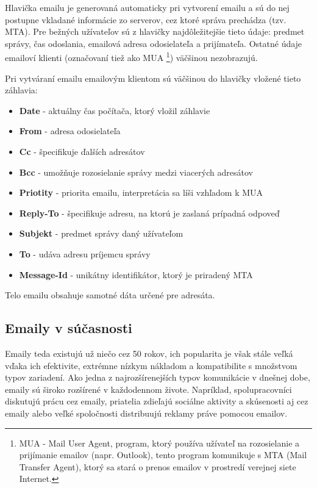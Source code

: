 \documentclass[slovak,master,public,dept460,male,cpdeclaration,oneside]{diploma}
\begin{document}
Hlavička emailu je generovaná automaticky pri vytvorení emailu a sú do nej postupne vkladané informácie zo serverov, cez ktoré správa prechádza (tzv. MTA). Pre bežných užívateľov sú z hlavičky najdôležitejšie tieto údaje: predmet správy, čas odoslania, emailová adresa odosielateľa a prijímateľa. Ostatné údaje emailoví klienti (označovaní tiež ako MUA \footnote{MUA - Mail User Agent, program, ktorý používa užívateľ na rozosielanie a prijímanie emailov (napr. Outlook), tento program komunikuje s MTA (Mail Transfer Agent), ktorý sa stará o prenos emailov v prostredí verejnej siete Internet.}) väčšinou nezobrazujú.


Pri vytváraní emailu emailovým klientom sú väčšinou do hlavičky vložené tieto záhlavia:

\begin{itemize}
\item \textbf{Date} - aktuálny čas počítača, ktorý vložil záhlavie
\item \textbf{From} - adresa odosielateľa
\item \textbf{Cc} - špecifikuje ďalších adresátov
\item \textbf{Bcc} - umožňuje rozosielanie správy medzi viacerých adresátov
\item \textbf{Priotity} - priorita emailu, interpretácia sa líši vzhľadom k MUA
\item \textbf{Reply-To} - špecifikuje adresu, na ktorú je zaslaná prípadná odpoveď
\item \textbf{Subjekt} - predmet správy daný užívateľom
\item \textbf{To} - udáva adresu príjemcu správy
\item \textbf{Message-Id} - unikátny identifikátor, ktorý je priradený MTA
\end{itemize}

Telo emailu obsahuje samotné dáta určené pre adresáta. 


\subsection{Emaily v súčasnosti}
Emaily teda existujú už niečo cez 50 rokov, ich popularita je však stále veľká vďaka ich efektivite, extrémne nízkym nákladom a kompatibilite s množstvom typov zariadení. Ako jedna z najrozšírenejších typov komunikácie v dnešnej dobe, emaily sú široko rozšírené v každodennom živote. Napríklad, spolupracovníci diskutujú prácu cez emaily, priatelia zdieľajú sociálne aktivity a skúsenosti aj cez emaily alebo veľké spoločnosti distribuujú reklamy práve pomocou emailov.
\end{document}

